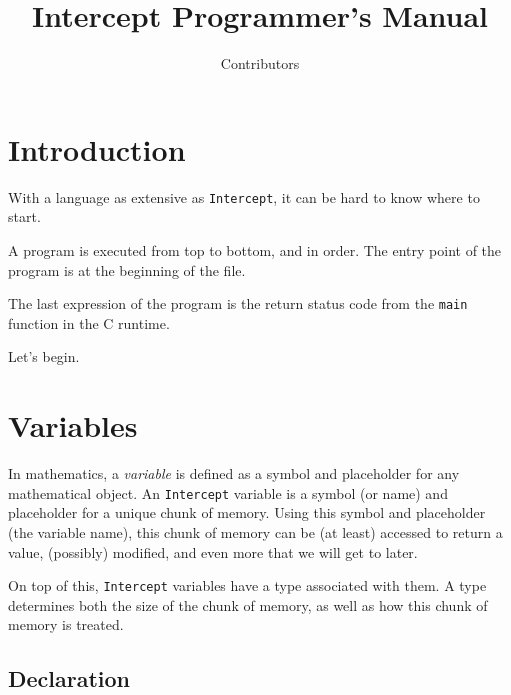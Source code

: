 \documentclass[12pt]{report}
\title  {Intercept Programmer's Manual}
\author {Contributors}
\begin{document}
\pagestyle{fancy}
\renewcommand{\chaptermark}[1]{\markboth{#1}{#1}}
\fancyhf{}
\fancyhead[C]{\leftmark}
\fancyfoot[C]{\thepage}

\hypersetup{pageanchor=false}
\begin{titlepage}
  \maketitle
\end{titlepage}

\chapter{Introduction}
\label{sec:intro}

With a language as extensive as \verb|Intercept|, it can be hard to know where to start.

A program is executed from top to bottom, and in order. The entry point of the program is at the beginning of the file.

The last expression of the program is the return status code from the \verb|main| function in the C runtime.

Let's begin.

\chapter{Variables}
\label{chpt:vars}

In mathematics, a \emph{variable} is defined as a symbol and placeholder for any mathematical object. An \verb|Intercept| variable is a symbol (or name) and placeholder for a unique chunk of memory. Using this symbol and placeholder (the variable name), this chunk of memory can be (at least) accessed to return a value, (possibly) modified, and even more that we will get to later.

On top of this, \verb|Intercept| variables have a type associated with them. A type determines both the size of the chunk of memory, as well as how this chunk of memory is treated.

\section*{Declaration}
\label{subsec:variables-declaration}
\end{document}
